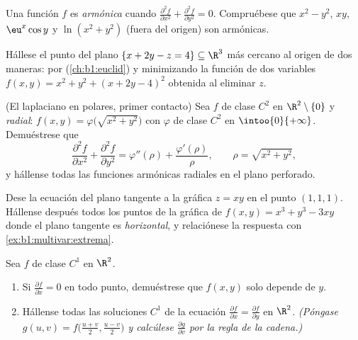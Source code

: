 \begin{exercise}[$\star\star$]\label{exo:b1:multivar:7}
Una función $f$ es \emph{armónica} cuando $\frac{\partial^2 f}{\partial
x^2} + \frac{\partial^2 f}{\partial y^2} = 0$. Compruébese que $x^2 -
y^2$, $xy$, $\eu^x\cos y$ y $\ln(x^2 + y^2)$ (fuera del origen) son
armónicas.
\end{exercise}

\begin{exercise}[$\star\star\star$]\label{exo:b1:multivar:8}
Hállese el punto del plano $\{x + 2y - z = 4\} \subseteq \R^3$
más cercano al origen de dos maneras: por 
(\cref{ch:b1:euclid}) y minimizando la función de dos variables
$f(x, y) = x^2 + y^2 + (x + 2y - 4)^2$ obtenida al eliminar $z$.
\end{exercise}

\begin{exercise}[$\star\star\star$]\label{exo:b1:multivar:9}
(El laplaciano en  polares, primer contacto) Sea $f$ de clase $C^2$ en
$\R^2 \setminus \{0\}$ y \emph{radial}: $f(x, y) =
\varphi\bigl(\sqrt{x^2+y^2}\bigr)$ con $\varphi$ de clase $C^2$ en
$\intoo{0}{+\infty}$. Demuéstrese que
\[
\frac{\partial^2 f}{\partial x^2} + \frac{\partial^2 f}{\partial
y^2} = \varphi''(\rho) + \frac{\varphi'(\rho)}{\rho},
\qquad \rho = \sqrt{x^2 + y^2},
\]
y hállense todas las funciones armónicas radiales en el plano perforado.
\end{exercise}

\begin{exercise}[$\star\star$]\label{exo:b1:multivar:10}
Dese la ecuación del plano tangente a la gráfica $z = xy$ en
el punto $(1, 1, 1)$. Hállense después todos los puntos de la gráfica de
$f(x,y) = x^3 + y^3 - 3xy$ donde el plano tangente es
\emph{horizontal}, y relaciónese la respuesta con
\cref{ex:b1:multivar:extrema}.
\end{exercise}

\begin{exercise}[$\star\star$]\label{exo:b1:multivar:11}
Sea $f$ de clase $C^1$ en $\R^2$.
\begin{enumerate}
  \item Si $\frac{\partial f}{\partial x} = 0$ en todo punto, demuéstrese
        que $f(x, y)$ solo depende de $y$.
  \item Hállense todas las soluciones $C^1$ de la ecuación
        $\frac{\partial f}{\partial x} = \frac{\partial
        f}{\partial y}$ en $\R^2$. \emph{(Póngase $g(u, v) =
        f\bigl(\frac{u+v}2, \frac{u-v}2\bigr)$ y calcúlese
        $\frac{\partial g}{\partial v}$ por la regla de la cadena.)}
\end{enumerate}
\end{exercise}

